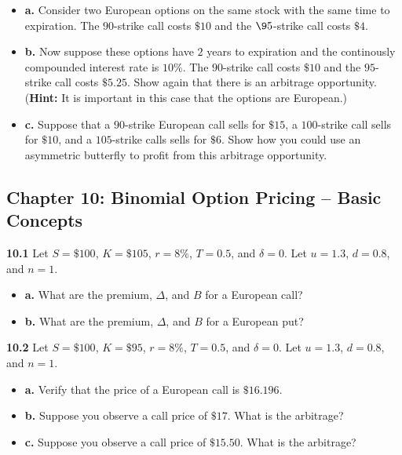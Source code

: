 \documentclass[
  letterpaper,
  DIV=11,
  numbers=noendperiod]{scrartcl}
\begin{document}
\begin{itemize}
\item
  \textbf{a.} Consider two European options on the same stock with the
  same time to expiration. The \(90\)-strike call costs \(\$10\) and the
  \(\95\)-strike call costs \(\$4\).
\item
  \textbf{b.} Now suppose these options have \(2\) years to expiration
  and the continously compounded interest rate is \(10\%\). The
  \(90\)-strike call costs \(\$10\) and the \(95\)-strike call costs
  \(\$5.25\). Show again that there is an arbitrage opportunity.
  (\textbf{Hint:} It is important in this case that the options are
  European.)
\item
  \textbf{c.} Suppose that a \(90\)-strike European call sells for
  \(\$15\), a \(100\)-strike call sells for \(\$10\), and a
  \(105\)-strike calls sells for \(\$6\). Show how you could use an
  asymmetric butterfly to profit from this arbitrage opportunity.
\end{itemize}

\subsection{Chapter 10: Binomial Option Pricing -- Basic
Concepts}\label{chapter-10-binomial-option-pricing-basic-concepts}

\textbf{10.1} Let \(S = \$100\), \(K = \$105\), \(r = 8\%\),
\(T = 0.5\), and \(\delta = 0\). Let \(u = 1.3\), \(d = 0.8\), and
\(n = 1\).

\begin{itemize}
\item
  \textbf{a.} What are the premium, \(\Delta\), and \(B\) for a European
  call?
\item
  \textbf{b.} What are the premium, \(\Delta\), and \(B\) for a European
  put?
\end{itemize}

\textbf{10.2} Let \(S = \$100\), \(K = \$95\), \(r = 8\%\), \(T = 0.5\),
and \(\delta = 0\). Let \(u = 1.3\), \(d = 0.8\), and \(n = 1\).

\begin{itemize}
\item
  \textbf{a.} Verify that the price of a European call is \(\$16.196\).
\item
  \textbf{b.} Suppose you observe a call price of \(\$17\). What is the
  arbitrage?
\item
  \textbf{c.} Suppose you observe a call price of \(\$15.50\). What is
  the arbitrage?
\end{itemize}
\end{document}

